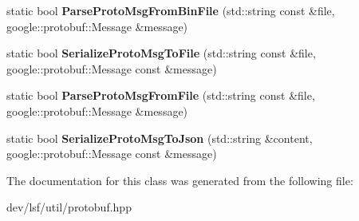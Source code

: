 \begin{DoxyCompactItemize}
\item 
\hypertarget{classlsf_1_1util_1_1Protobuf_a7710a96992ab07fee0fa2bdef894350c}{
static bool {\bfseries ParseProtoMsgFromBinFile} (std::string const \&file, google::protobuf::Message \&message)}
\label{classlsf_1_1util_1_1Protobuf_a7710a96992ab07fee0fa2bdef894350c}

\item 
\hypertarget{classlsf_1_1util_1_1Protobuf_ac1763e3fcf2f87249f6d35b3af6baece}{
static bool {\bfseries SerializeProtoMsgToFile} (std::string const \&file, google::protobuf::Message const \&message)}
\label{classlsf_1_1util_1_1Protobuf_ac1763e3fcf2f87249f6d35b3af6baece}

\item 
\hypertarget{classlsf_1_1util_1_1Protobuf_ab54b7115f588bd83bab816eabfda72ab}{
static bool {\bfseries ParseProtoMsgFromFile} (std::string const \&file, google::protobuf::Message \&message)}
\label{classlsf_1_1util_1_1Protobuf_ab54b7115f588bd83bab816eabfda72ab}

\item 
\hypertarget{classlsf_1_1util_1_1Protobuf_aeb78417e1539188b2f975ad7bdc860a7}{
static bool {\bfseries SerializeProtoMsgToJson} (std::string \&content, google::protobuf::Message const \&message)}
\label{classlsf_1_1util_1_1Protobuf_aeb78417e1539188b2f975ad7bdc860a7}

\end{DoxyCompactItemize}


The documentation for this class was generated from the following file:\begin{DoxyCompactItemize}
\item 
dev/lsf/util/protobuf.hpp\end{DoxyCompactItemize}
